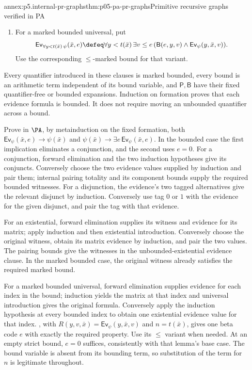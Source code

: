 \begin{annexitem}{annex:p5.internal-pr-graphs}{thm:p05-pa-pr-graphs}{Primitive recursive graphs verified in PA}
\begin{enumerate}
bound by \(y<t(\bar x)\).  For a \(\leq\)-marked existential use
that marked bound instead.  Pairing itself supplies \(y\leq e\)
whenever the displayed matrix holds.
\item For a marked bounded universal, put
\[
 \mathsf{Ev}_{\forall y<t(\bar x)\,\psi}(\bar x,e)\defeq
 \forall y<t(\bar x)\,\exists v\leq e\,
   (\mathsf B(e,y,v)\land\mathsf{Ev}_\psi(y,\bar x,v)).
\]
Use the corresponding \(\leq\)-marked bound for that variant.
\end{enumerate}
Every quantifier introduced in these clauses is marked bounded, every bound
is an arithmetic term independent of its bound variable, and
\(\mathsf P,\mathsf B\) have their fixed quantifier-free or bounded
expansions.  Induction on formation proves that each evidence formula is
bounded.  It does not require moving an unbounded quantifier across a bound.

Prove in \(\PA\), by metainduction on the fixed formation, both
\(\mathsf{Ev}_\psi(\bar x,e)\to\psi(\bar x)\) and
\(\psi(\bar x)\to\exists e\,\mathsf{Ev}_\psi(\bar x,e)\).
In the bounded case the first implication eliminates a conjunction, and
the second uses \(e=0\).  For a conjunction, forward elimination and
the two induction hypotheses give its conjuncts.  Conversely choose the
two evidence values supplied by induction and pair them; internal pairing
totality and its component bounds supply the required bounded witnesses.
For a disjunction, the evidence's two tagged alternatives give the relevant
disjunct by induction.  Conversely use tag \(0\) or \(1\) with the
evidence for the given disjunct, and pair the tag with that evidence.

For an existential, forward elimination supplies its witness and evidence
for its matrix; apply induction and then existential introduction.
Conversely choose the original witness, obtain its matrix evidence by
induction, and pair the two values.  The pairing bounds give the witnesses
in the unbounded-existential evidence clause.  In the marked bounded case,
the original witness already satisfies the required marked bound.

For a marked bounded universal, forward elimination supplies evidence for
each index in the bound; induction yields the matrix at that index and
universal introduction gives the original formula.  Conversely apply the
induction hypothesis at every bounded index to obtain one existential
evidence value for that index.  , with
\(R(y,v,\bar x)=\mathsf{Ev}_\psi(y,\bar x,v)\) and
\(n=t(\bar x)\), gives one beta code \(e\) with exactly the required
property.  Use its \(\leq\) variant when needed.  At an empty strict
bound, \(e=0\) suffices, consistently with that lemma's base case.
The bound variable is absent from its bounding term, so substitution of
the term for \(n\) is legitimate throughout.


\end{annexitem}
